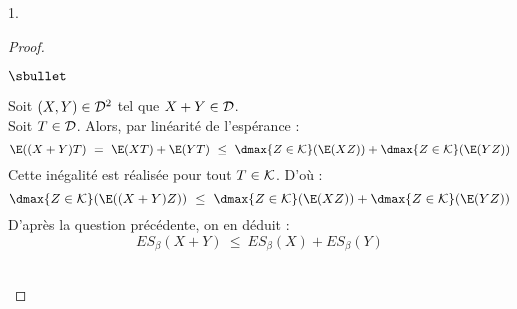 \documentclass[11pt]{article}%
\begin{document}
\begin{noliste}{1.}
\begin{proof}
\begin{noliste}{$\sbullet$}
      \item Soit $(X,Y) \in {\cal D}^2$ tel que $X +Y\in {\cal D}$.\\
      Soit $T \in {\cal D}$. Alors, par linéarité de l'espérance :
      \[
        \E((X+Y)T) \ = \ \E(XT) + \E(YT) \ \leq \ \dmax{Z\in {\cal K}}
        (\E(XZ)) + \dmax{Z\in {\cal K}} (\E(YZ))
      \]
      Cette inégalité est réalisée pour tout $T\in {\cal K}$.
      D'où : 
      \[
	\dmax{Z\in {\cal K}}(\E((X+Y)Z)) \ 
	\leq \ \dmax{Z\in {\cal K}}(\E(XZ)) +
        \dmax{Z\in {\cal K}}(\E(YZ))
      \]
      D'après la question précédente, on en déduit :
      \[
        ES_\beta(X+Y) \ \leq \ ES_\beta(X) + ES_\beta(Y)
      \]
    \end{noliste}
    ~\\[-1cm]
  \end{proof}
\end{noliste}
\end{document}
